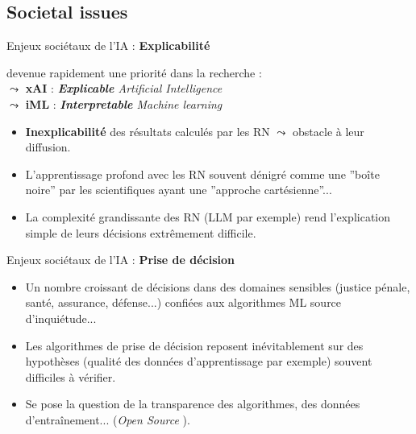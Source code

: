\documentclass[11pt,serif,mathserif,compress,hyperref={colorlinks}]{beamer}
\begin{document}
\subsection{Societal issues}

\begin{frame}{Enjeux sociétaux de l'IA : {\bf Explicabilité}}

  devenue rapidement une priorité dans la recherche : \\
  $\leadsto$ {\bf xAI} : {\em {\bf Explicable} Artificial Intelligence} \\
  $\leadsto$ {\bf iML} : {\em {\bf Interpretable} Machine learning} \smallskip

  \begin{tcolorbox}[title={\bf Explicabilité} des Réseaux de Neurones (RN)]
    \begin{itemize}
    \item<1-> {\bf Inexplicabilité} des résultats calculés par les RN $\leadsto$ obstacle à leur diffusion.
    \item<2-> L'apprentissage profond avec les RN souvent dénigré comme une ''boîte noire'' par les scientifiques ayant une ''approche cartésienne''...
    \item<3-> La complexité grandissante des RN (LLM par exemple) rend l'explication simple de leurs décisions extrêmement difficile.
    \end{itemize}
  \end{tcolorbox}   
    
\end{frame}

\begin{frame}{Enjeux sociétaux de l'IA : {\bf Prise de décision}}
  
  \begin{tcolorbox}[title={\bf Prise de décision}]
    \begin{itemize}
    \item<1-> Un nombre croissant de décisions dans des domaines sensibles (justice pénale, santé, assurance, défense...)
      confiées aux algorithmes ML source d'inquiétude...
    \item<2-> Les algorithmes de prise de décision reposent inévitablement sur des hypothèses
      (qualité des données d'apprentissage par exemple) souvent difficiles à vérifier.
    \item<3-> Se pose la question de la transparence des algorithmes, des données d'entraînement... ({\em Open Source} ).
    \end{itemize}
  \end{tcolorbox}   
    
\end{frame}
\end{document}
